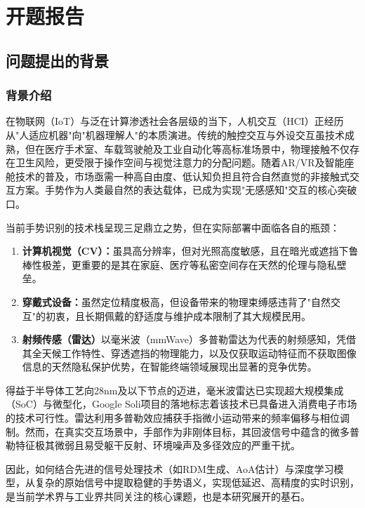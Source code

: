 \cleardoublepage
\section{开题报告}

\subsection{问题提出的背景}

\subsubsection{背景介绍}
在物联网（IoT）与泛在计算渗透社会各层级的当下，人机交互（HCI）正经历从"人适应机器"向"机器理解人"的本质演进。传统的触控交互与外设交互虽技术成熟，但在医疗手术室、车载驾驶舱及工业自动化等高标准场景中，物理接触不仅存在卫生风险，更受限于操作空间与视觉注意力的分配问题。随着AR/VR及智能座舱技术的普及，市场亟需一种高自由度、低认知负担且符合自然直觉的非接触式交互方案。手势作为人类最自然的表达载体，已成为实现"无感感知"交互的核心突破口。

当前手势识别的技术栈呈现三足鼎立之势，但在实际部署中面临各自的瓶颈：
\begin{enumerate}
    \item \textbf{计算机视觉（CV）：}虽具高分辨率，但对光照高度敏感，且在暗光或遮挡下鲁棒性极差，更重要的是其在家庭、医疗等私密空间存在天然的伦理与隐私壁垒。
    \item \textbf{穿戴式设备：}虽然定位精度极高，但设备带来的物理束缚感违背了"自然交互"的初衷，且长期佩戴的舒适度与维护成本限制了其大规模民用。
    \item \textbf{射频传感（雷达）}以毫米波（mmWave）多普勒雷达为代表的射频感知，凭借其全天候工作特性、穿透遮挡的物理能力，以及仅获取运动特征而不获取图像信息的天然隐私保护优势，在智能终端领域展现出显著的竞争优势。
\end{enumerate}

得益于半导体工艺向28nm及以下节点的迈进，毫米波雷达已实现超大规模集成（SoC）与微型化，Google Soli项目的落地标志着该技术已具备进入消费电子市场的技术可行性。雷达利用多普勒效应捕获手指微小运动带来的频率偏移与相位调制。然而，在真实交互场景中，手部作为非刚体目标，其回波信号中蕴含的微多普勒特征极其微弱且易受躯干反射、环境噪声及多径效应的严重干扰。

因此，如何结合先进的信号处理技术（如RDM生成、AoA估计）与深度学习模型，从复杂的原始信号中提取稳健的手势语义，实现低延迟、高精度的实时识别，是当前学术界与工业界共同关注的核心课题，也是本研究展开的基石。

